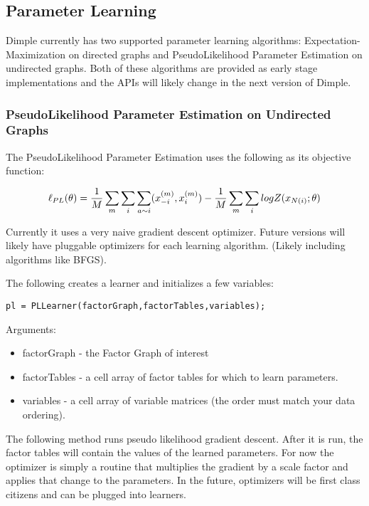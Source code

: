 \subsection{Parameter Learning}

Dimple currently has two supported parameter learning algorithms: Expectation-Maximization on directed graphs and PseudoLikelihood Parameter Estimation on undirected graphs.  Both of these algorithms are provided as early stage implementations and the APIs will likely change in the next version of Dimple.

\subsubsection{PseudoLikelihood Parameter Estimation on Undirected Graphs}

The PseudoLikelihood Parameter Estimation uses the following as its objective function:

\[
\ell_{PL}(\theta) = \frac{1}{M}\sum_m \sum_i \sum_{a \sim  i} (x_{-i}^{(m)},x_i^{(m)}) - \\
\frac{1}{M} \sum_m \sum_i log Z(x_{N(i)};\theta)
\]

Currently it uses a very naive gradient descent optimizer.  Future versions will likely have pluggable optimizers for each learning algorithm.  (Likely including algorithms like BFGS).


The following creates a learner and initializes a few variables:

\begin{lstlisting}
pl = PLLearner(factorGraph,factorTables,variables);
\end{lstlisting}

Arguments:
\begin{itemize}
\item factorGraph - the Factor Graph of interest
\item factorTables - a cell array of factor tables for which to learn parameters.
\item variables - a cell array of variable matrices (the order must match your data ordering).
\end{itemize}


The following method runs pseudo likelihood gradient descent.  After it is run, the factor tables will contain the values of the learned parameters.  For now the optimizer is simply a routine that multiplies the gradient by a scale factor and applies that change to the parameters.  In the future, optimizers will be first class citizens and can be plugged into learners.

